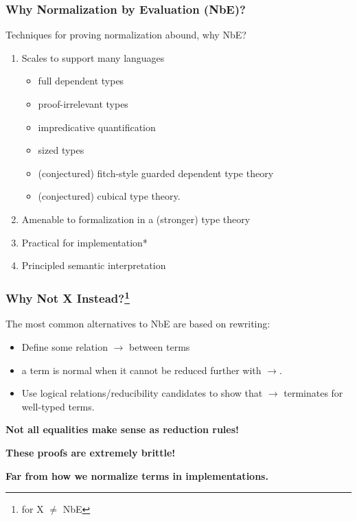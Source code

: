 \documentclass[svgnames]{beamer}
\newcommand\fmttm[1]{{\color{Blue}#1}}
\begin{document}
\begin{frame}
  \frametitle{Why Normalization by Evaluation (NbE)?}
  Techniques for proving normalization abound, why NbE?
  \begin{enumerate}
  \item Scales to support many languages
    \begin{itemize}
    \item full dependent types
    \item proof-irrelevant types
    \item impredicative quantification
    \item sized types
    \item (conjectured) fitch-style guarded dependent type theory
    \item (conjectured) cubical type theory.
    \end{itemize}
  \item Amenable to formalization in a (stronger) type theory
  \item Practical for implementation*
  \item Principled semantic interpretation
  \end{enumerate}
\end{frame}

\begin{frame}
  \frametitle{Why Not X Instead?\footnote{for X $\neq$ NbE}}
  \centering
  The most common alternatives to NbE are based on rewriting:
  \begin{itemize}
  \item Define some relation $\to$ between \fmttm{terms}
  \item a \fmttm{term} is normal when it cannot be reduced further with $\to$.
  \item Use logical relations/reducibility candidates to show that $\to$ terminates for well-typed
    \fmttm{terms}.
  \end{itemize}
  \pause
  \textbf{Not all equalities make sense as reduction rules!}

  \pause
  \textbf{These proofs are extremely brittle!}

  \pause
  \textbf{Far from how we normalize terms in implementations.}
\end{frame}
\end{document}
